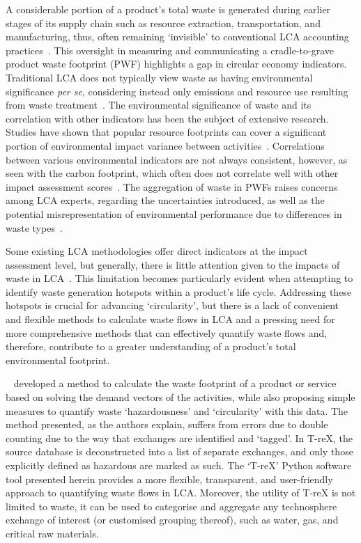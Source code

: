 \documentclass[a4paper,fleqn]{cas-dc}
\begin{document}
A considerable portion of a product's total waste is generated during earlier
stages of its supply chain such as resource extraction, transportation, and
manufacturing, thus, often remaining `invisible' to conventional LCA accounting
practices~\citep{laurenti2016wastefootprint}. This oversight in measuring and
communicating a cradle-to-grave product waste footprint (PWF) highlights a gap
in circular economy indicators. Traditional LCA does not typically view waste
as having environmental significance \textit{per se}, considering instead only
emissions and resource use resulting from waste
treatment~\citep{bisinella2024wastelca, laurenti2023wastefootprint}. The
environmental significance of waste and its correlation with other indicators
has been the subject of extensive research. Studies have shown that popular
resource footprints can cover a significant portion of environmental impact
variance between activities~\citep{steinmann2017resourcefootprints,laurenti2023wastefootprint}.
Correlations between various environmental indicators are not always
consistent, however, as seen with the carbon footprint, which often does not
correlate well with other impact assessment
scores~\citep{laurenti2012carbonfootprint}. The aggregation of waste in PWFs
raises concerns among LCA experts, regarding the uncertainties introduced, as
well as the potential misrepresentation of environmental performance due to
differences in waste
types~\citep{chen2021methoduncertainty,huijbregts2010energyfootprint}.


Some existing LCA methodologies offer  direct indicators at the impact
assessment level,  but generally, there is little attention given to the impacts
of  waste in LCA~\citep{lauran2020abioticdepletion}. This limitation becomes
particularly evident when attempting to identify waste generation hotspots
within a product's life cycle. Addressing these hotspots is crucial for
advancing `circularity', but there is a lack of convenient and flexible methods
to calculate waste flows in LCA and a pressing need for more comprehensive
methods that can effectively quantify waste flows and, therefore, contribute to
a greater understanding of a product's total environmental footprint.


~\cite{laurenti2023wastefootprint} developed a method to calculate the waste footprint of a product or service based on solving the demand vectors of the activities, while also proposing simple measures to quantify waste `hazardousness' and `circularity' with this data. The method presented,  as the authors  explain, suffers from errors due to double counting due to the way that exchanges are identified and  `tagged'. In T-reX, the source database is deconstructed into a list of separate exchanges, and only those explicitly defined as hazardous are marked as such. The `T-reX' Python software tool presented herein provides a more flexible, transparent, and user-friendly approach to quantifying waste flows in LCA\@. Moreover, the utility of T-reX is not limited to waste, it can be used to categorise and aggregate any technosphere exchange of interest (or customised grouping thereof), such as water, gas, and critical raw materials.
\end{document}
